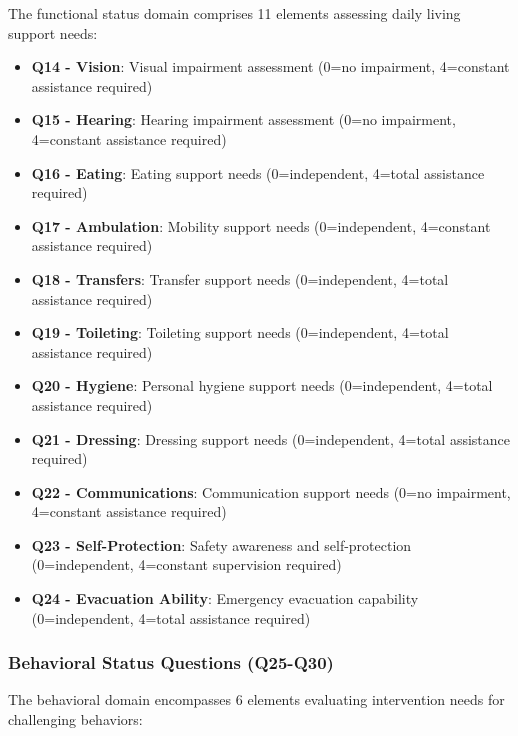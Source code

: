 The functional status domain comprises 11 elements assessing daily living support needs:

\begin{itemize}
    \item \textbf{Q14 - Vision}: Visual impairment assessment (0=no impairment, 4=constant assistance required)
    \item \textbf{Q15 - Hearing}: Hearing impairment assessment (0=no impairment, 4=constant assistance required)
    \item \textbf{Q16 - Eating}: Eating support needs (0=independent, 4=total assistance required)
    \item \textbf{Q17 - Ambulation}: Mobility support needs (0=independent, 4=constant assistance required)
    \item \textbf{Q18 - Transfers}: Transfer support needs (0=independent, 4=total assistance required)
    \item \textbf{Q19 - Toileting}: Toileting support needs (0=independent, 4=total assistance required)
    \item \textbf{Q20 - Hygiene}: Personal hygiene support needs (0=independent, 4=total assistance required)
    \item \textbf{Q21 - Dressing}: Dressing support needs (0=independent, 4=total assistance required)
    \item \textbf{Q22 - Communications}: Communication support needs (0=no impairment, 4=constant assistance required)
    \item \textbf{Q23 - Self-Protection}: Safety awareness and self-protection (0=independent, 4=constant supervision required)
    \item \textbf{Q24 - Evacuation Ability}: Emergency evacuation capability (0=independent, 4=total assistance required)
\end{itemize}

\subsubsection{Behavioral Status Questions (Q25-Q30)}

The behavioral domain encompasses 6 elements evaluating intervention needs for challenging behaviors:

